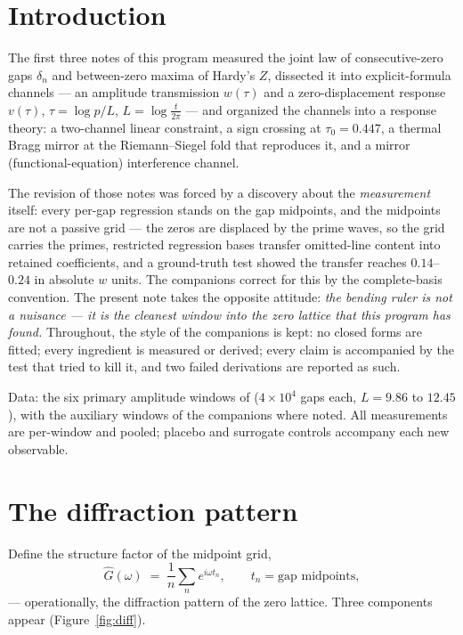 \documentclass[12pt]{amsart}
\begin{document}
\maketitle

\section{Introduction}

The first three notes of this program \cite{companion1, companion2,
companion3} measured the joint law of consecutive-zero gaps $\delta_n$
and between-zero maxima of Hardy's $Z$, dissected it into explicit-formula
channels --- an amplitude transmission $w(\tau)$ and a zero-displacement
response $v(\tau)$, $\tau = \log p / L$, $L = \log\frac{t}{2\pi}$ ---
and organized the channels into a response theory: a two-channel linear
constraint, a sign crossing at $\tau_0 = 0.447$, a thermal Bragg mirror
at the Riemann--Siegel fold that reproduces it, and a mirror
(functional-equation) interference channel.

The revision of those notes was forced by a discovery about the
\emph{measurement} itself: every per-gap regression stands on the gap
midpoints, and the midpoints are not a passive grid --- the zeros are
displaced by the prime waves, so the grid carries the primes, restricted
regression bases transfer omitted-line content into retained
coefficients, and a ground-truth test showed the transfer reaches
$0.14$--$0.24$ in absolute $w$ units. The companions correct for this by
the complete-basis convention. The present note takes the opposite
attitude: \emph{the bending ruler is not a nuisance --- it is the
cleanest window into the zero lattice that this program has found.}
Throughout, the style of the companions is kept: no closed forms are
fitted; every ingredient is measured or derived; every claim is
accompanied by the test that tried to kill it, and two failed
derivations are reported as such.

Data: the six primary amplitude windows of \cite{companion2}
($4\times10^4$ gaps each, $L = 9.86$ to $12.45$), with the auxiliary
windows of the companions where noted. All measurements are per-window
and pooled; placebo and surrogate controls accompany each new
observable.

\section{The diffraction pattern}\label{sec:diff}

Define the structure factor of the midpoint grid,
\[
\hat G(\omega) \;=\; \frac{1}{n}\sum_{n} e^{i\omega t_n},
\qquad t_n = \text{gap midpoints},
\]
--- operationally, the diffraction pattern of the zero lattice. Three
components appear (Figure~\ref{fig:diff}).
\end{document}
